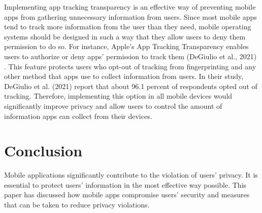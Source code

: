 \documentclass{article}
\begin{document}
\medskip

Implementing app tracking transparency is an effective way of preventing mobile apps from gathering unnecessary information from users. Since most mobile apps tend to track more information from the user than they need, mobile operating systems should be designed in such a way that they allow users to deny them permission to do so. For instance, Apple’s App Tracking Transparency enables users to authorize or deny apps’ permission to track them (DeGiulio et al., 2021) \cite{DeGiulio21}. This feature protects users who opt-out of tracking from fingerprinting and any other method that apps use to collect information from users. In their study, DeGiulio et al. (2021) \cite{DeGiulio21} report that about 96.1 percent of respondents opted out of tracking. Therefore, implementing this option in all mobile devices would significantly improve privacy and allow users to control the amount of information apps can collect from their devices.

\medskip
\section*{Conclusion}
Mobile applications significantly contribute to the violation of users’ privacy. It is essential to protect users’ information in the most effective way possible. This paper has discussed how mobile apps compromise users’ security and measures that can be taken to reduce privacy violations.





\printbibliography
\end{document}
